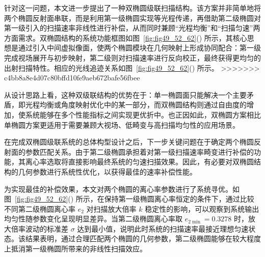 针对这一问题，本文进一步提出了一种双椭圆级联扫描结构。该方案并非简单地将两个椭圆反射面串联，而是利用第一级椭圆实现等光程传递，再借助第二级椭圆对第一级引入的扫描速率非线性进行补偿，从而同时兼顾``光程均衡''和``扫描匀速''两方面需求。双椭圆结构的系统功能框图如图~\ref{fig:fig49_52_62}() 所示，其核心思想是通过引入中间虚拟像面，使两个椭圆模块在几何映射上形成协同配合：第一级完成视场展开与初步映射，第二级则对扫描速率进行反向校正，最终获得更均匀的出射扫描特性。相应的光线追迹关系如图~\ref{fig:fig49_52_62}() 所示。
>>>>>>> c4bb8a8e4d07c80bffd10fe9aeb672bafe56fbee

从设计思路上看，这种双级联结构的优势在于：单一椭圆面只能解决一个主要矛盾，即光程均衡或角度映射优化中的某一部分，而双椭圆结构则通过自由度的增加，使系统能够在多个性能指标之间实现更优折中。也正因如此，双椭圆方案相比单椭圆方案更适用于需要兼顾大视场、低畸变与高扫描均匀性的应用场景。

在完成双椭圆级联系统的总体构型设计之后，下一步关键问题在于确定两个椭圆反射面的参数匹配关系。由于第二级椭圆承担着对第一级扫描速率畸变进行补偿的功能，其离心率选取将直接影响最终系统的匀速扫描效果。因此，有必要对双椭圆结构的几何参数进行系统性优化，以获得最佳的速率补偿性能。

为实现最佳的补偿效果，本文对两个椭圆的离心率参数进行了系统寻优。如图~\ref{fig:fig49_52_62}() 所示，在保持第一级椭圆离心率恒定的条件下，通过比较不同第二级椭圆离心率 $e_2$ 对扫描放大倍率 $k$ 稳定性的影响，可以观察到系统输出均匀性随参数变化呈现明显差异。当第二级椭圆离心率取 $e_{2\min}=0.3278$ 时，放大倍率波动的标准差 $\sigma$ 达到最小值，说明此时系统的扫描速率最接近理想匀速状态。该结果表明，通过合理匹配两个椭圆的几何参数，第二级椭圆能够在较大程度上抵消第一级椭圆所带来的非线性扫描效应。

